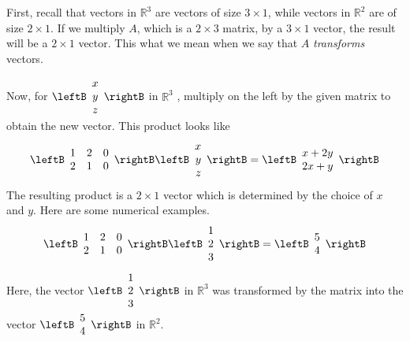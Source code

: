 \begin{solution}
First, recall that vectors in $\mathbb{R}^3$ are vectors of size $ 3 \times 1$, while vectors in $
\mathbb{R}^{2}$ are of size $2 \times 1$. If we multiply $A$, which is a $2 \times 3$ matrix, by a $3 \times 1$ vector,
the result will be a $2 \times 1$ vector. This what we mean when we say that $A$ {\em transforms \em} vectors.

Now, for $\leftB
\begin{array}{c}
x \\
y \\
z
\end{array}
\rightB $ in $\mathbb{R}^3$ , multiply on the left by the given matrix to obtain the new
vector. This product looks like 
\begin{equation*}
\leftB
\begin{array}{rrr}
1 & 2 & 0 \\
2 & 1 & 0
\end{array}
\rightB 
\leftB
\begin{array}{r}
x \\
y \\
z
\end{array}
\rightB = 
\leftB
\begin{array}{c}
x+2y \\
2x+y
\end{array}
\rightB
\end{equation*}
The resulting product is a $2 \times 1$ vector which is determined by the choice of $x$ and $y$. 
 Here are some numerical examples.
\begin{equation*}
\leftB
\begin{array}{ccc}
1 & 2 & 0 \\
2 & 1 & 0
\end{array}
\rightB \leftB
\begin{array}{c}
1 \\
2 \\
3
\end{array}
\rightB =\allowbreak \leftB
\begin{array}{c}
5 \\
4
\end{array}
\rightB
\end{equation*}
Here, the vector
$\leftB
\begin{array}{c}
1 \\
2 \\
3
\end{array} \rightB$
in $\mathbb{R}^3$ was transformed by the matrix into the vector
$\leftB
\begin{array}{c} 
5 \\
4
\end{array}\rightB$
in $\mathbb{R}^2$. 
 

\end{solution}
